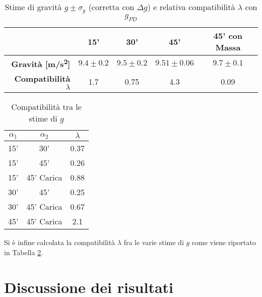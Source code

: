 \documentclass[a4paper,11pt,oneside]{article}
\begin{document}
\begin{table}[h!]%
    \centering
    \begin{tabular}{r|c|c|c|c}
    \toprule
    & \textbf{15'} & \textbf{30'} & \textbf{45'} & \textbf{45' con Massa}\\
    \midrule
        \textbf{Gravità [\si{m/s^2}]}       & $9.4\pm0.2$ & $9.5\pm0.2$ & $9.51\pm0.06$ & $9.7\pm0.1$ \\
      \textbf{Compatibilità $\lambda$} &1.7& 0.75& 4.3 & 0.09 \\
        \bottomrule
    \end{tabular}
    \caption{Stime di gravità $g \pm \sigma_{g}$ (corretta con $\Delta g$) e relativa compatibilità $\lambda$ con $g_{PD}$}
    \label{tab:stima_b_g}
\end{table}

\begin{table}[h!]
\centering
    \begin{tabular}{c|c|c}
        \toprule
        $\alpha_{1}$& $\alpha_{2}$  & $\lambda$\\
        \midrule
        15'  &30'   &0.37\\
        15'  &45'   &0.26\\
        15'  &45' Carica &0.88\\
        30'  &45'   &0.25\\
        30'  &45' Carica &0.67\\
        45'  &45' Carica &2.1\\
        \bottomrule
    \end{tabular}
    \caption{Compatibilità tra le stime di $g$}
    \label{tab:compatibilita_d}
\end{table}
Si è infine calcolata la compatibilità $\lambda$ fra le varie stime di $g$ come viene riportato in Tabella \ref{tab:compatibilita_d}.

\section{Discussione dei risultati}
\end{document}
